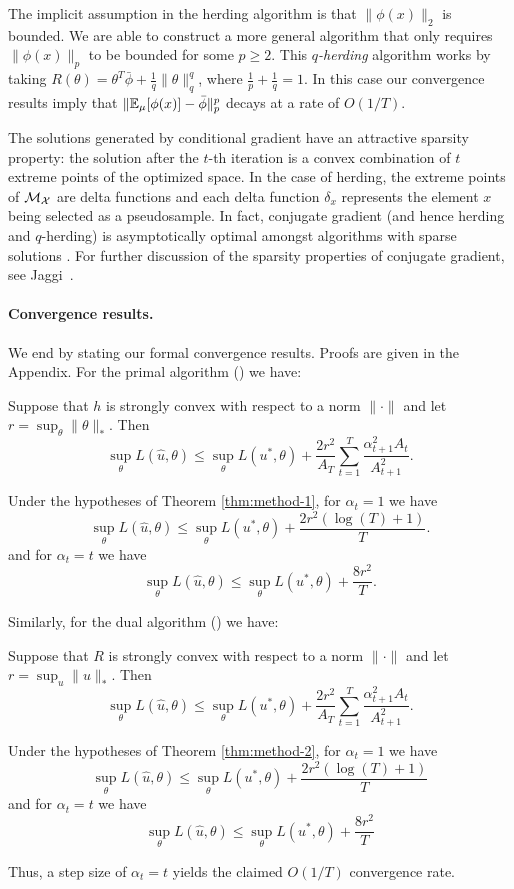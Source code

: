 \documentclass{article} %
\newcommand{\new}{\marginpar{\textcolor{NAColor}{NEW}}}
\begin{document}
The implicit assumption in the herding algorithm is that $\|\phi(x)\|_2$ is 
bounded. We are able to construct a more general algorithm that only requires 
$\|\phi(x)\|_p$ to be bounded for some $p \geq 2$. This \emph{$q$-herding} 
algorithm works by taking 
$R(\theta) = \theta^T\bar{\phi} + \frac{1}{q}\|\theta\|_q^q$, where 
$\frac{1}{p} + \frac{1}{q} = 1$. In this case our convergence results imply that 
$\|\mathbb{E}_{\mu}[\phi(x)]-\bar{\phi}\|_p^p$ decays at a rate of $O(1/T)$.

 \new The solutions generated by conditional gradient have 
an attractive sparsity property: the solution after the $t$-th iteration is 
a convex combination of $t$ extreme points of the optimized space. In the 
case of herding, the extreme points of $\mathcal{M}_{\mathcal{X}}$ are delta
functions and each delta function $\delta_{x}$ represents the element $x$ 
being selected as a pseudosample. In fact, conjugate gradient (and hence herding
and $q$-herding) is asymptotically optimal amongst algorithms with sparse 
solutions \cite{Jaggi:2013}. For further discussion of the sparsity properties 
of conjugate gradient, see Jaggi~\cite{Jaggi:2013}.

\paragraph{Convergence results.}
We end by stating our formal convergence results. Proofs are given in the Appendix. For the primal algorithm 
(\primal) we have:
\begin{theorem}
\label{thm:method-1}
Suppose that $h$ is strongly convex with respect to a norm $\|\cdot\|$ 
and let $r = \sup_{\theta} \|\theta\|_{*}$. Then 
\[ \sup_{\theta} L(\hat{u}, \theta) \leq \sup_{\theta} L(u^*, \theta) + \frac{2r^2}{A_T} \sum_{t=1}^T \frac{\alpha_{t+1}^2A_t}{A_{t+1}^2}. \]
\end{theorem}
\begin{corollary} 
\label{cor:method-1}
Under the hypotheses of Theorem \ref{thm:method-1}, for $\alpha_{t} = 1$ we have
\[ \sup_{\theta} L(\hat{u}, \theta) \leq \sup_{\theta} L(u^*, \theta) + \frac{2r^2 (\log (T) + 1)}{T}. \]
and for $\alpha_t = t$ we have
\[ \sup_{\theta} L(\hat{u}, \theta) \leq \sup_{\theta} L(u^*, \theta) + \frac{8r^2}{T}. \]
\end{corollary}
Similarly, for the dual algorithm (\dual) we have:
\begin{theorem}
\label{thm:method-2}
Suppose that $R$ is strongly convex with respect to a norm $\|\cdot\|$ 
and let $r = \sup_{u} \|u\|_{*}$. Then 
\[ \sup_{\theta} L(\hat{u}, \theta) \leq \sup_{\theta} L(u^*, \theta) + \frac{2r^2}{A_T} \sum_{t=1}^T \frac{\alpha_{t+1}^2A_t}{A_{t+1}^2}. \]
\end{theorem}
\begin{corollary}
\label{cor:method-2}
Under the hypotheses of Theorem \ref{thm:method-2}, for $\alpha_t = 1$ we have
\[ \sup_{\theta} L(\hat{u}, \theta) \leq \sup_{\theta} L(u^*, \theta) + \frac{2r^2(\log(T) + 1)}{T} \]
and for $\alpha_t = t$ we have
\[ \sup_{\theta} L(\hat{u}, \theta) \leq \sup_{\theta} L(u^*, \theta) + \frac{8r^2}{T} \]
\end{corollary}
Thus, a step size of $\alpha_t = t$ yields the claimed $O(1/T)$ convergence rate.
\end{document}
